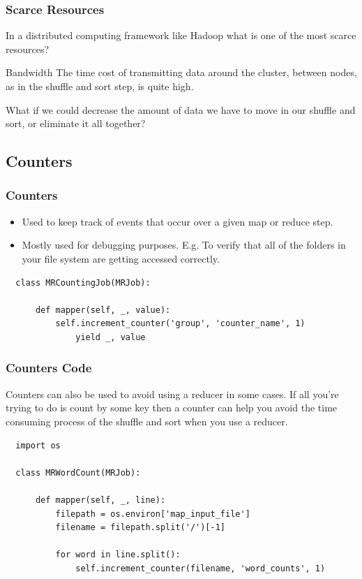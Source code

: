 \documentclass{beamer}
\begin{document}
\begin{frame}
  \frametitle{Scarce Resources}
    In a distributed computing framework like Hadoop what is one of the most scarce resources? \pause
  \vspace{2mm}
  \begin{alertblock}{Bandwidth}
    The time cost of transmitting data around the cluster, between nodes, as in the shuffle and sort step, is quite high.
  \end{alertblock} \pause
  \vspace{4mm}
  \parbox{\linewidth}{What if we could decrease the amount of data we have to move in our shuffle and sort, or eliminate it all together?}
\end{frame}

\subsection{Counters}
\begin{frame}[fragile]
  \frametitle{Counters}
  \begin{itemize}
    \item Used to keep track of events that occur over a given map or reduce step.
    \item Mostly used for debugging purposes. E.g. To verify that all of the folders in your file system are getting accessed correctly.
  \end{itemize} \vspace{2mm}
  \begin{lstlisting}
  class MRCountingJob(MRJob):

      def mapper(self, _, value):
          self.increment_counter('group', 'counter_name', 1)
              yield _, value
  \end{lstlisting}
\end{frame}

\begin{frame}[fragile]
  \frametitle{Counters Code}
  \parbox{\linewidth}{Counters can also be used to avoid using a reducer in some cases. If all you're trying to do is count by some key then a counter can help you avoid the time consuming process of the shuffle and sort when you use a reducer.}
  \vspace{2mm}
  \begin{lstlisting}
  import os

  class MRWordCount(MRJob):
    
      def mapper(self, _, line):
          filepath = os.environ['map_input_file']
          filename = filepath.split('/')[-1]

          for word in line.split():
              self.increment_counter(filename, 'word_counts', 1)
  \end{lstlisting}
\end{frame}
\end{document}
